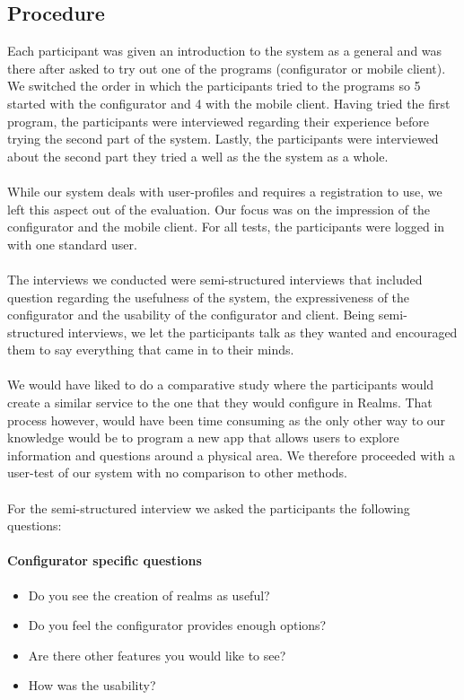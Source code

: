 \subsection{Procedure} %
\label{sub:procedure}
Each participant was given an introduction to the system as a general and was there after asked to try out one of the programs (configurator or mobile client). We switched the order in which the participants tried to the programs so 5 started with the configurator and 4 with the mobile client. Having tried the first program, the participants were interviewed regarding their experience before trying the second part of the system. Lastly, the participants were interviewed about the second part they tried a well as the the system as a whole. 
\\\\
While our system deals with user-profiles and requires a registration to use, we left this aspect out of the evaluation. Our focus was on the impression of the configurator and the mobile client. For all tests, the participants were logged in with one standard user.
\\\\
The interviews we conducted were semi-structured interviews that included question regarding the usefulness of the system, the expressiveness of the configurator and the usability of the configurator and client. Being semi-structured interviews, we let the participants talk as they wanted and encouraged them to say everything that came in to their minds. 
\\\\
We would have liked to do a comparative study where the participants would create a similar service to the one that they would configure in Realms. That process however, would have been time consuming as the only other way to our knowledge would be to program a new app that allows users to explore information and questions around a physical area. We therefore proceeded with a user-test of our system with no comparison to other methods.
\\\\
For the semi-structured interview we asked the participants the following questions:

\paragraph{Configurator specific questions} %
\label{par:configurator_specific_questiosn}
\begin{itemize}
	\item Do you see the creation of realms as useful?
	\item Do you feel the configurator provides enough options?
	\item Are there other features you would like to see?
	\item How was the usability?
\end{itemize}

